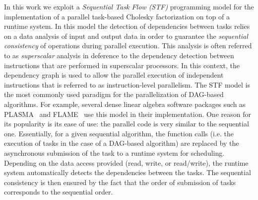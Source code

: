 \documentclass{article}
\begin{document}
In this work we exploit a \textit{Sequential Task Flow
  (STF)} programming model for the implementation of a parallel
task-based Cholesky factorization on top of a runtime system. In this
model the detection of dependencies between tasks relies on a data
analysis of input and output data in order to guarantee the
\textit{sequential consistency} of operations during parallel
execution. This analysis is often referred to as
\textit{superscalar} analysis in deference to the dependency detection
between instructions that are performed in superscalar processors. In
this context, the dependency graph is used to allow the parallel
execution of independent instructions that is referred to as
instruction-level parallelism.
The STF model is the most commonly used paradigm for the
parallelization of DAG-based algorithms.
For example, several
dense linear algebra software packages such as
PLASMA~\cite{a.d.d.h.ea:09} and FLAME~\cite{i.c.q.q.ea:12} use this
model in their implementation. One reason for its popularity is
its ease of use: the parallel code is
very similar to the sequential one. Essentially, for a given
sequential algorithm, the
function calls (i.e. the execution of tasks in the case of a DAG-based
algorithm) are replaced by the asynchronous submission of the task to a runtime
system for scheduling. Depending on the data access
provided (read, write, or read/write), the runtime system automatically detects 
the dependencies
between the tasks. The sequential consistency is then ensured by the
fact that the order of submission of tasks corresponds to the
sequential order.
\end{document}
